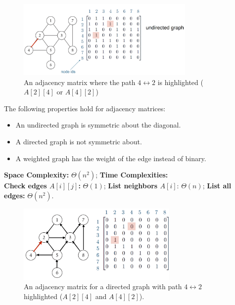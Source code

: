   
\begin{figure}[h]
  \begin{center}
    \includegraphics[height=1.5in]{./Sections/graphs/adj_matrix.png}
  \end{center}
   \caption{An adjacency matrix where the path $4\leftrightarrow2$ is highlighted ($A[2][4]$ or $A[4][2]$)}\label{fig:adj_matrix}
\end{figure}
\begin{theo}

  The following properties hold for adjacency matrices:
    \begin{itemize}
        \item An undirected graph is symmetric about the diagonal.
        \item A directed graph is not symmetric about.
        \item A weighted graph has the weight of the edge instead of binary.
    \end{itemize}
    \noindent
    \textbf{Space Complexity:} $\Theta (n^2)$; \textbf{Time Complexities:}\\
    \textbf{Check edges $A[i][j]$:} $\Theta (1)$; \textbf{List neighbors $A[i]$}: $\Theta(n)$; \textbf{List all edges:} $\Theta(n^2)$.
\end{theo}
\begin{figure}[h]
  \begin{center}
    \includegraphics[height=1.5in]{./Sections/graphs/adj_matrix_dir.png}
  \end{center}
   \caption{An adjacency matrix for a directed graph with path $4\leftrightarrow2$ highlighted ($A[2][4]$ and $A[4][2]$).}\label{fig:adj_matri_dir}
\end{figure}

